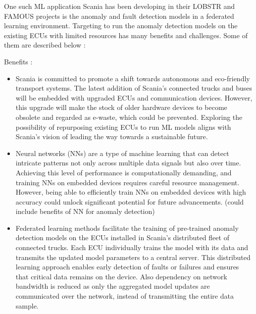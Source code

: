 One such ML application Scania has been developing in their \textsc{LOBSTR} and \textsc{FAMOUS} projects is the anomaly and fault detection models in a federated learning environment. Targeting to run the anomaly detection models on the existing ECUs with limited resources has many benefits and challenges. Some of them are described below :

Benefits :
\begin{itemize}
	\item Scania is committed to promote a shift towards autonomous and eco-friendly transport systems. The latest addition of Scania's connected trucks and buses will be embedded with upgraded ECUs and communication devices. However, this upgrade will make the stock of older hardware devices to become obsolete and regarded as e-waste, which could be prevented. Exploring the possibility of repurposing existing ECUs to run ML models aligns with Scania's vision of leading the way towards a sustainable future. 
	\item Neural networks (NNs) are a type of machine learning that can detect intricate patterns not only across multiple data signals but also over time. Achieving this level of performance is computationally demanding, and training NNs on embedded devices requires careful resource management. However, being able to efficiently train NNs on embedded devices with high accuracy could unlock significant potential for future advancements. (could include benefits of NN for anomaly detection)
	\item Federated learning methods facilitate the training of pre-trained anomaly detection models on the ECUs installed in Scania's distributed fleet of connected trucks. Each ECU individually trains the model with its data and transmits the updated model parameters to a central server. This distributed learning approach enables early detection of faults or failures and ensures that critical data remains on the device. Also dependency on network bandwidth is reduced as only the aggregated model updates are communicated over the network, instead of transmitting the entire data sample.
\end{itemize}

